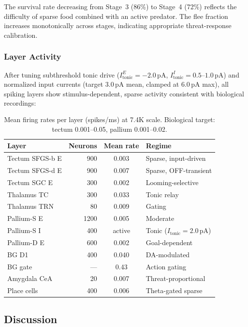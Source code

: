 \documentclass[9pt]{elife}
\begin{document}
The survival rate decreasing from Stage~3 (86\%) to Stage~4 (72\%)
reflects the difficulty of sparse food combined with an active predator.
The flee fraction increases monotonically across stages, indicating
appropriate threat-response calibration.

\subsubsection{Layer Activity}

After tuning subthreshold tonic drive ($I_{\mathrm{tonic}}^E = -2.0$\,pA,
$I_{\mathrm{tonic}}^I = 0.5$--$1.0$\,pA) and normalized input currents
(target 3.0\,pA mean, clamped at 6.0\,pA max), all spiking layers show
stimulus-dependent, sparse activity consistent with biological recordings:

\begin{table}[h!]
\centering
\caption{Mean firing rates per layer (spikes/ms) at 7.4K scale.
Biological target: tectum 0.001--0.05, pallium 0.001--0.02.}
\begin{tabular}{l r c l}
\hline
\textbf{Layer} & \textbf{Neurons} & \textbf{Mean rate} & \textbf{Regime} \\
\hline
Tectum SFGS-b E & 900  & 0.003 & Sparse, input-driven \\
Tectum SFGS-d E & 900  & 0.007 & Sparse, OFF-transient \\
Tectum SGC E    & 300  & 0.002 & Looming-selective \\
Thalamus TC     & 300  & 0.033 & Tonic relay \\
Thalamus TRN    & 80   & 0.009 & Gating \\
Pallium-S E     & 1200 & 0.005 & Moderate \\
Pallium-S I     & 400  & active & Tonic ($I_\mathrm{tonic}=2.0$\,pA) \\
Pallium-D E     & 600  & 0.002 & Goal-dependent \\
BG D1           & 400  & 0.040 & DA-modulated \\
BG gate         & ---  & 0.43  & Action gating \\
Amygdala CeA    & 20   & 0.007 & Threat-proportional \\
Place cells     & 400  & 0.006 & Theta-gated sparse \\
\hline
\end{tabular}
\end{table}

\subsection{Discussion}
\end{document}
